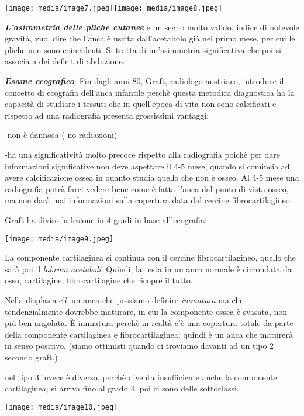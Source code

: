 \documentclass[]{article}
\begin{document}
\texttt{[image: media/image7.jpeg]}\texttt{[image: media/image8.jpeg]}

\emph{\textbf{L'asimmetria delle pliche cutanee}} è un segno molto
valido, indice di notevole gravità, vuol dire che l'anca è uscita
dall'acetabolo già nel primo mese, per cui le pliche non sono
coincidenti. Si tratta di un'asimmetria significativa che poi si associa
a dei deficit di abduzione.

\textbf{\emph{Esame ecografico}}: Fin dagli anni 80, Graft, radiologo
austriaco, introduce il concetto di ecografia dell'anca infantile perchè
questa metodica diagnostica ha la capacità di studiare i tessuti che in
quell'epoca di vita non sono calcificati e rispetto ad una radiografia
presenta grossissimi vantaggi:

-non è dannosa ( no radiazioni)

-ha una significatività molto precoce rispetto alla radiografia poichè
per dare informazioni significative non deve aspettare il 4-5 mese,
quando si comincia ad avere calcificazione ossea in quanto studia quello
che non è osseo. Al 4-5 mese una radiografia potrà farci vedere bene
come è fatta l'anca dal punto di vista osseo, ma non darà mai
informazioni sulla copertura data dal cercine fibrocartilagineo.

Graft ha diviso la lesione in 4 gradi in base all'ecografia:

\texttt{[image: media/image9.jpeg]}

La componente cartilaginea si continua con il cercine fibrocartilagineo,
quello che sarà poi il \emph{labrum acetaboli}. Quindi, la testa in un
anca normale è circondata da osso, cartilagine, fibrocartilagine che
ricopre il tutto.

Nella displasia c'è un anca che possiamo definire \emph{immatura} ma che
tendenzialmente dovrebbe maturare, in cui la componente ossea è svasata,
non più ben angolata. È immatura perchè in realtà c'è una copertura
totale da parte della componente cartilaginea e fibrocartilaginea;
quindi è un anca che maturerà in senso positivo. (siamo ottimisti quando
ci troviamo davanti ad un tipo 2 secondo graft.)

nel tipo 3 invece è diverso, perchè diventa insufficiente anche la
componente cartilaginea; si arriva fino al grado 4, poi ci sono delle
sottoclassi.

\texttt{[image: media/image10.jpeg]}
\end{document}
